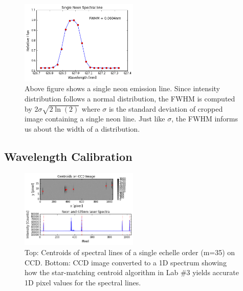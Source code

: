 \documentclass[authoryear, 12pt,5p, times]{elsarticle}
\begin{document}
\begin{figure}[h!]
\includegraphics[width=0.5\textwidth]{figures/single_neon}
\caption{Above figure shows a single neon emission line. Since intensity distribution follows a normal distribution, the FWHM is computed by 2$\sigma\sqrt{2\ln(2)}$ where $\sigma$ is the standard deviation of cropped image containing a single neon line. Just like $\sigma$, the FWHM informs us about the width of a distribution. }
\label{fwhm}
\end{figure}
\subsection{Wavelength Calibration}
\begin{figure}[h!]
\includegraphics[width=0.5\textwidth]{figures/neon_spectra}
\caption{Top: Centroids of spectral lines of a single echelle order (m=35) on CCD. Bottom: CCD image converted to a 1D spectrum showing how the star-matching centroid algorithm in Lab \#3 yields accurate 1D pixel values for the spectral lines.}
\label{neon_spectra}
\end{figure}
\end{document}
